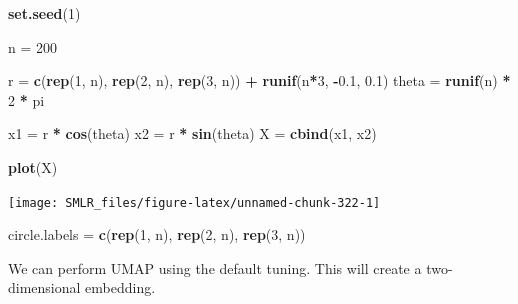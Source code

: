 \documentclass[
]{book}
\newenvironment{Shaded}{\begin{snugshade}}{\end{snugshade}}
\newcommand{\AttributeTok}[1]{\textcolor[rgb]{0.13,0.29,0.53}{#1}}
\newcommand{\DecValTok}[1]{\textcolor[rgb]{0.00,0.00,0.81}{#1}}
\newcommand{\DocumentationTok}[1]{\textcolor[rgb]{0.56,0.35,0.01}{\textbf{\textit{#1}}}}
\newcommand{\FloatTok}[1]{\textcolor[rgb]{0.00,0.00,0.81}{#1}}
\newcommand{\FunctionTok}[1]{\textcolor[rgb]{0.13,0.29,0.53}{\textbf{#1}}}
\newcommand{\NormalTok}[1]{#1}
\newcommand{\OtherTok}[1]{\textcolor[rgb]{0.56,0.35,0.01}{#1}}
\newcommand{\SpecialCharTok}[1]{\textcolor[rgb]{0.81,0.36,0.00}{\textbf{#1}}}
\theoremstyle{definition}
\theoremstyle{definition}
\theoremstyle{definition}
\theoremstyle{definition}
\theoremstyle{remark}
\begin{document}
\begin{Shaded}
\begin{Highlighting}[]
  \FunctionTok{set.seed}\NormalTok{(}\DecValTok{1}\NormalTok{)}

\NormalTok{  n }\OtherTok{=} \DecValTok{200}
  
\NormalTok{  r }\OtherTok{=} \FunctionTok{c}\NormalTok{(}\FunctionTok{rep}\NormalTok{(}\DecValTok{1}\NormalTok{, n), }\FunctionTok{rep}\NormalTok{(}\DecValTok{2}\NormalTok{, n), }\FunctionTok{rep}\NormalTok{(}\DecValTok{3}\NormalTok{, n)) }\SpecialCharTok{+} \FunctionTok{runif}\NormalTok{(n}\SpecialCharTok{*}\DecValTok{3}\NormalTok{, }\SpecialCharTok{{-}}\FloatTok{0.1}\NormalTok{, }\FloatTok{0.1}\NormalTok{)}
\NormalTok{  theta }\OtherTok{=} \FunctionTok{runif}\NormalTok{(n) }\SpecialCharTok{*} \DecValTok{2} \SpecialCharTok{*}\NormalTok{ pi}

\NormalTok{  x1 }\OtherTok{=}\NormalTok{ r }\SpecialCharTok{*} \FunctionTok{cos}\NormalTok{(theta)}
\NormalTok{  x2 }\OtherTok{=}\NormalTok{ r }\SpecialCharTok{*} \FunctionTok{sin}\NormalTok{(theta)}
\NormalTok{  X }\OtherTok{=} \FunctionTok{cbind}\NormalTok{(x1, x2)}
  
  \FunctionTok{plot}\NormalTok{(X)}
\end{Highlighting}
\end{Shaded}

\begin{center}\texttt{[image: SMLR\_files/figure-latex/unnamed-chunk-322-1]} \end{center}

\begin{Shaded}
\begin{Highlighting}[]
\NormalTok{  circle.labels }\OtherTok{=} \FunctionTok{c}\NormalTok{(}\FunctionTok{rep}\NormalTok{(}\DecValTok{1}\NormalTok{, n), }\FunctionTok{rep}\NormalTok{(}\DecValTok{2}\NormalTok{, n), }\FunctionTok{rep}\NormalTok{(}\DecValTok{3}\NormalTok{, n))}
\end{Highlighting}
\end{Shaded}

We can perform UMAP using the default tuning. This will create a two-dimensional embedding.

\begin{Shaded}
\end{Shaded}
\end{document}

